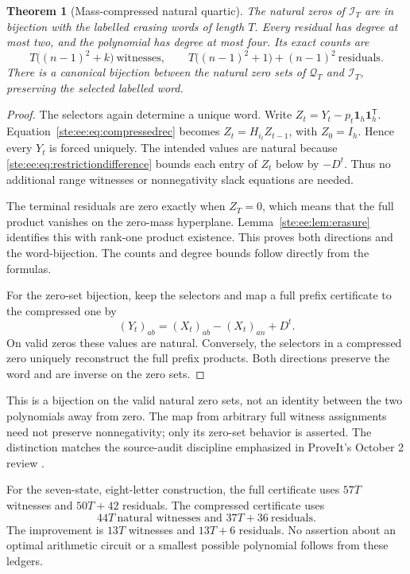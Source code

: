 \documentclass[11pt,letterpaper]{article}
\newtheorem{theorem}{Theorem}[section]
\theoremstyle{definition}
\theoremstyle{remark}
\newcommand{\one}{\mathbf 1}
\newcommand{\transpose}{^{\mathsf T}}
\begin{document}
\begin{theorem}[Mass-compressed natural quartic]\label{ste:ee:thm:compressed}
The natural zeros of $\mathcal I_T$ are in bijection with the labelled erasing
words of length $T$. Every residual has degree at most two, and the polynomial
has degree at most four. Its exact counts are
\begin{equation}
 \boxed{\ T\bigl((n-1)^2+k\bigr)\ \text{witnesses},\qquad
 T\bigl((n-1)^2+1\bigr)+(n-1)^2\ \text{residuals}.\ }
 \label{ste:ee:eq:compressedcounts}
\end{equation}
There is a canonical bijection between the natural zero sets of
$\mathcal Q_T$ and $\mathcal I_T$, preserving the selected labelled word.
\end{theorem}
\begin{proof}
The selectors again determine a unique word. Write
$Z_t=Y_t-p_t\one_h\one_h\transpose$. Equation~\eqref{ste:ee:eq:compressedrec} becomes
$Z_t=H_{i_t}Z_{t-1}$, with $Z_0=I_h$. Hence every $Y_t$ is forced uniquely.
The intended values are natural because \eqref{ste:ee:eq:restrictiondifference} bounds
each entry of $Z_t$ below by $-D^t$. Thus no additional range witnesses or
nonnegativity slack equations are needed.

The terminal residuals are zero exactly when $Z_T=0$, which means that the full
product vanishes on the zero-mass hyperplane. Lemma~\ref{ste:ee:lem:erasure} identifies
this with rank-one product existence. This proves both directions and the
word-bijection. The counts and degree bounds follow directly from the formulas.

For the zero-set bijection, keep the selectors and map a full prefix certificate
to the compressed one by
\[
 (Y_t)_{ab}=(X_t)_{ab}-(X_t)_{an}+D^t.
\]
On valid zeros these values are natural. Conversely, the selectors in a
compressed zero uniquely reconstruct the full prefix products. Both directions
preserve the word and are inverse on the zero sets.
\end{proof}

This is a bijection on the valid natural zero sets, not an identity between the
two polynomials away from zero. The map from arbitrary full witness assignments
need not preserve nonnegativity; only its zero-set behavior is asserted.
The distinction matches the source-audit discipline emphasized in ProveIt's
October 2 review \cite{repoReview}.

For the seven-state, eight-letter construction, the full certificate uses
$57T$ witnesses and $50T+42$ residuals. The compressed certificate uses
\begin{equation}
 \boxed{44T\ \text{natural witnesses and }37T+36\ \text{residuals}.}
 \label{ste:ee:eq:sevenledger}
\end{equation}
The improvement is $13T$ witnesses and $13T+6$ residuals. No assertion about an
optimal arithmetic circuit or a smallest possible polynomial follows from
these ledgers.
\end{document}
